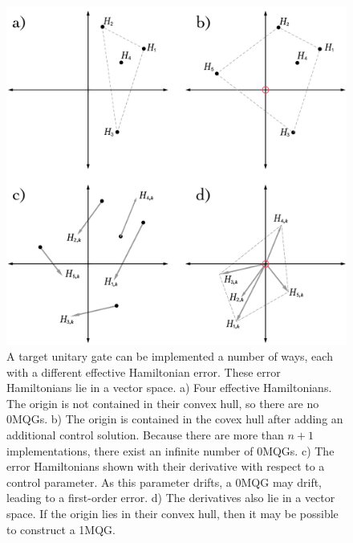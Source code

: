 \documentclass[aps,nofootinbib,pra,notitlepage,twocolumn]{revtex4-1}
\begin{document}
\begin{figure}
  \centering
  \includegraphics[width=\columnwidth]{vectorspace.pdf}
  \caption{A target unitary gate can be implemented a number of ways, each with a different effective Hamiltonian error. These error Hamiltonians lie in a vector space. a) Four effective Hamiltonians. The origin is not contained in their convex hull, so there are no 0MQGs. b) The origin is contained in the covex hull after adding an additional control solution. Because there are more than $n+1$ implementations, there exist an infinite number of 0MQGs. c) The error Hamiltonians shown with their derivative with respect to a control parameter. As this parameter drifts, a 0MQG may drift, leading to a first-order error. d) The derivatives also lie in a vector space. If the origin lies in their convex hull, then it may be possible to construct a 1MQG.}
  \label{fig:vectorspace}
\end{figure}
\end{document}
